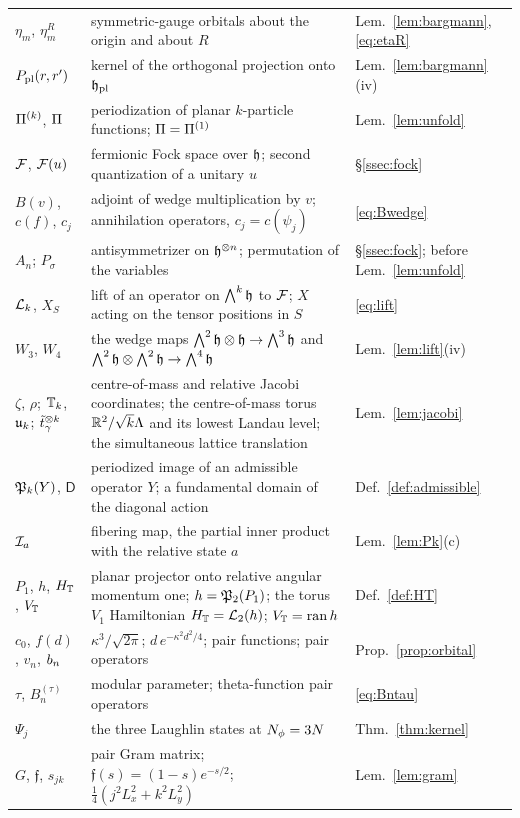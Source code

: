\begin{longtable}{@{}>{\raggedright\arraybackslash}p{}>{\raggedright\arraybackslash}p{}>{\raggedright\arraybackslash}p{}@{}}
$\eta_m$, $\eta_m^R$ & symmetric-gauge orbitals about the origin and about $R$ & Lem.~\ref{lem:bargmann}, \eqref{eq:etaR}\\
$P_{\mathrm{pl}}(r,r')$ & kernel of the orthogonal projection onto $\mathfrak{h}_{\mathrm{pl}}$ & Lem.~\ref{lem:bargmann}(iv)\\
$\Pi^{(k)}$, $\Pi$ & periodization of planar $k$-particle functions; $\Pi=\Pi^{(1)}$ & Lem.~\ref{lem:unfold}\\
$\mathcal{F}$, $\mathcal{F}(u)$ & fermionic Fock space over $\mathfrak{h}$; second quantization of a unitary $u$ & \S\ref{ssec:fock}\\
$B(v)$, $c(f)$, $c_j$ & adjoint of wedge multiplication by $v$; annihilation operators, $c_j=c(\psi_j)$ & \eqref{eq:Bwedge}\\
$A_n$; $P_\sigma$ & antisymmetrizer on $\mathfrak{h}^{\otimes n}$; permutation of the variables & \S\ref{ssec:fock}; before Lem.~\ref{lem:unfold}\\
$\mathcal{L}_k$, $X_S$ & lift of an operator on $\bigwedge^k\mathfrak{h}$ to $\mathcal{F}$; $X$ acting on the tensor positions in $S$ & \eqref{eq:lift}\\
$W_3$, $W_4$ & the wedge maps $\bigwedge^2\mathfrak{h}\otimes\mathfrak{h}\to\bigwedge^3\mathfrak{h}$ and $\bigwedge^2\mathfrak{h}\otimes\bigwedge^2\mathfrak{h}\to\bigwedge^4\mathfrak{h}$
& Lem.~\ref{lem:lift}(iv)\\
$\zeta$, $\rho$; $\mathbb{T}_k$, $\mathfrak{u}_k$; $\tilde t^{\otimes k}_\gamma$ & centre-of-mass and relative Jacobi coordinates; the centre-of-mass torus
$\mathbb{R}^2/\sqrt k\Lambda$ and its lowest Landau level; the simultaneous lattice translation & Lem.~\ref{lem:jacobi}\\
$\mathfrak{P}_k(Y)$, $\mathsf D$ & periodized image of an admissible operator $Y$; a fundamental domain of the diagonal action
& Def.~\ref{def:admissible}\\
$\mathcal{I}_a$ & fibering map, the partial inner product with the relative state $a$ & Lem.~\ref{lem:Pk}(c)\\
$P_1$, $h$, $H_{\mathbb{T}}$, $V_{\mathbb{T}}$ & planar projector onto relative angular momentum one; $h=\mathfrak{P}_2(P_1)$; the torus $V_1$ Hamiltonian
$H_{\mathbb{T}}=\mathcal{L}_2(h)$; $V_{\mathbb{T}}=\operatorname{ran} h$ & Def.~\ref{def:HT}\\
$c_0$, $f(d)$, $v_n$, $b_{n}$ & $\kappa^3/\sqrt{2\pi}$; $d\,e^{-\kappa^2d^2/4}$; pair functions; pair operators
& Prop.~\ref{prop:orbital}\\
$\tau$, $B_n^{(\tau)}$ & modular parameter; theta-function pair operators & \eqref{eq:Bntau}\\
$\Psi_j$ & the three Laughlin states at $N_{\phi}=3N$ & Thm.~\ref{thm:kernel}\\
$G$, $\mathfrak f$, $s_{jk}$ & pair Gram matrix; $\mathfrak f(s)=(1-s)e^{-s/2}$; $\frac14(j^2L_x^2+k^2L_y^2)$ & Lem.~\ref{lem:gram}\\

\end{longtable}
